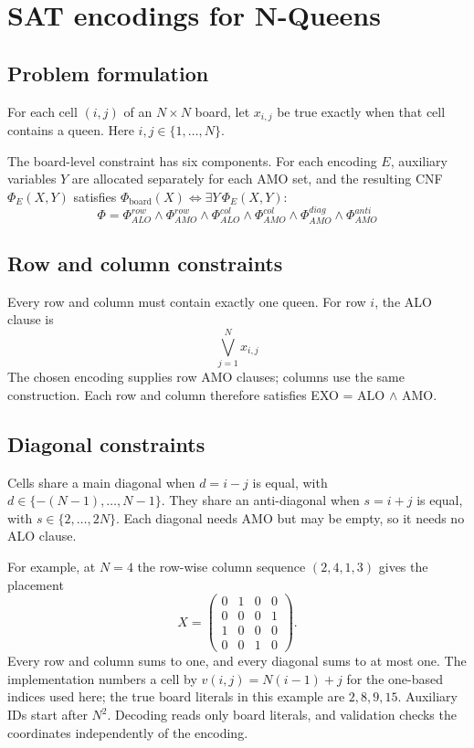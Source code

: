 \documentclass[a4paper,fleqn]{cas-sc}
\begin{document}
\section{SAT encodings for N-Queens}

\subsection{Problem formulation}
For each cell $(i,j)$ of an $N\times N$ board, let $x_{i,j}$ be true exactly when that cell contains a queen. Here $i,j\in\{1,\dots,N\}$.

The board-level constraint has six components. For each encoding $E$, auxiliary variables $Y$ are allocated separately for each AMO set, and the resulting CNF $\Phi_E(X,Y)$ satisfies $\Phi_{\mathrm{board}}(X)\iff\exists Y\,\Phi_E(X,Y)$:
\begin{equation}
\Phi = \Phi^{row}_{ALO} \wedge \Phi^{row}_{AMO} \wedge \Phi^{col}_{ALO} \wedge \Phi^{col}_{AMO} \wedge \Phi^{diag}_{AMO} \wedge \Phi^{anti}_{AMO}
\end{equation}

\subsection{Row and column constraints}
Every row and column must contain exactly one queen. For row $i$, the ALO clause is
\begin{equation}
\bigvee_{j=1}^{N} x_{i,j}
\end{equation}
The chosen encoding supplies row AMO clauses; columns use the same construction. Each row and column therefore satisfies EXO = ALO $\wedge$ AMO.

\subsection{Diagonal constraints}
Cells share a main diagonal when $d=i-j$ is equal, with $d\in\{-(N-1),\dots,N-1\}$. They share an anti-diagonal when $s=i+j$ is equal, with $s\in\{2,\dots,2N\}$. Each diagonal needs AMO but may be empty, so it needs no ALO clause.

For example, at $N=4$ the row-wise column sequence $(2,4,1,3)$ gives the placement
\[
X=\begin{pmatrix}
0&1&0&0\\
0&0&0&1\\
1&0&0&0\\
0&0&1&0
\end{pmatrix}.
\]
Every row and column sums to one, and every diagonal sums to at most one. The implementation numbers a cell by $v(i,j)=N(i-1)+j$ for the one-based indices used here; the true board literals in this example are $2,8,9,15$. Auxiliary IDs start after $N^2$. Decoding reads only board literals, and validation checks the coordinates independently of the encoding.
\end{document}

